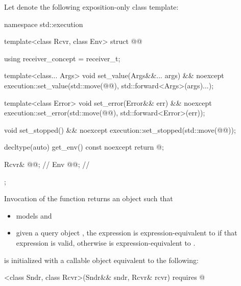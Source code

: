 \pnum
Let  denote the following exposition-only class template:
\begin{codeblock}
namespace std::execution {
  template<class Rcvr, class Env>
  struct @@ {
    using receiver_concept = receiver_t;

    template<class... Args>
    void set_value(Args&&... args) && noexcept {
      execution::set_value(std::move(@@), std::forward<Args>(args)...);
    }

    template<class Error>
    void set_error(Error&& err) && noexcept {
      execution::set_error(std::move(@@), std::forward<Error>(err));
    }

    void set_stopped() && noexcept {
      execution::set_stopped(std::move(@@));
    }

    decltype(auto) get_env() const noexcept {
      return @\seebelow@;
    }

    Rcvr& @@;                 // \expos
    Env @@;                    // \expos
  };
}
\end{codeblock}
Invocation of the function 
returns an object  such that
\begin{itemize}
\item
{} models  and
\item
given a query object ,
the expression  is expression-equivalent
to  if that expression is valid,
otherwise  is expression-equivalent
to .
\end{itemize}

\pnum
{}
is initialized with a callable object equivalent to the following:
\begin{codeblock}
[]<class Sndr, class Rcvr>(Sndr&& sndr, Rcvr& rcvr) requires @
\end{codeblock}

